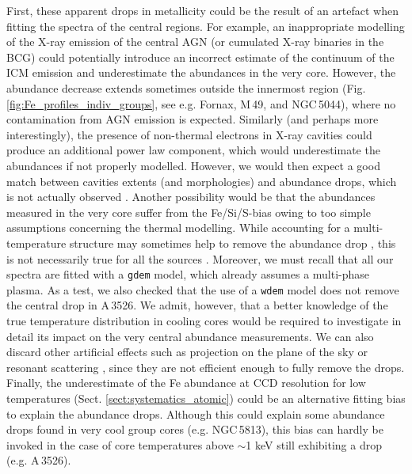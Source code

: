 \documentclass{aa}
\begin{document}
First, these apparent drops in metallicity could be the result of an artefact when fitting the spectra of the central regions. For example, an inappropriate modelling of the X-ray emission of the central AGN (or cumulated X-ray binaries in the BCG) could potentially introduce an incorrect estimate of the continuum of the ICM emission and underestimate the abundances in the very core. However, the abundance decrease extends sometimes outside the innermost region (Fig. \ref{fig:Fe_profiles_indiv_groups}, see e.g. Fornax, M\,49, and NGC\,5044), where no contamination from AGN emission is expected. Similarly (and perhaps more interestingly), the presence of non-thermal electrons in X-ray cavities could produce an additional power law component, which would underestimate the abundances if not properly modelled. However, we would then expect a good match between cavities extents (and morphologies) and abundance drops, which is not actually observed \citep{2015MNRAS.447..417P,2016MNRAS.457...82S}. Another possibility would be that the abundances measured in the very core suffer from the Fe/Si/S-bias \citep[e.g.][]{2000MNRAS.311..176B} owing to too simple assumptions concerning the thermal modelling. While accounting for a multi-temperature structure may sometimes help to remove the abundance drop \citep[e.g. in 2A\,0335+096;][]{2006A&A...449..475W}, this is not necessarily true for all the sources \citep[e.g.][]{2004MNRAS.349..952S,2013MNRAS.433.3290P}. Moreover, we must recall that all our spectra are fitted with a \texttt{gdem} model, which already assumes a multi-phase plasma. As a test, we also checked that the use of a \texttt{wdem} model does not remove the central drop in A\,3526. We admit, however, that a better knowledge of the true temperature distribution in cooling cores would be required to investigate in detail its impact on the very central abundance measurements. We can also discard other artificial effects such as projection on the plane of the sky \citep{2007MNRAS.381.1381S} or resonant scattering \citep{2006MNRAS.370...63S}, since they are not efficient enough to fully remove the drops. Finally, the underestimate of the Fe abundance at CCD resolution for low temperatures (Sect. \ref{sect:systematics_atomic}) could be an alternative fitting bias to explain the abundance drops. Although this could explain some abundance drops found in very cool group cores (e.g. NGC\,5813), this bias can hardly be invoked in the case of core temperatures above $\sim$1 keV still exhibiting a drop (e.g. A\,3526). 
\end{document}
